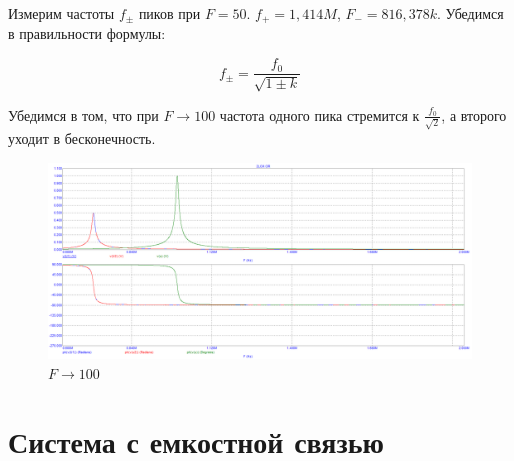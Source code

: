 \documentclass[a4paper, 12pt]{article}%
\begin{document}
\begin{enumerate}
Измерим частоты $f_{\pm}$ пиков при $F = 50$. $f_+ = 1,414M$, $F_- = 816,378k$. Убедимся в правильности формулы:

\[f_{\pm} = \frac{f_0}{\sqrt{1\pm k}}\]

Убедимся в том, что при $F \longrightarrow 100$ частота одного пика стремится к $\frac{f_0}{\sqrt{2}}$, а второго уходит в бесконечность.

\begin{figure}[h!]
\centering
\includegraphics[scale = 0.4]{images/plot11_2.png}
\caption{$F \longrightarrow 100$}
\label{fig:Image1}
\end{figure}

\end{enumerate}

\newpage

\section{Система с емкостной связью}
\end{document}
